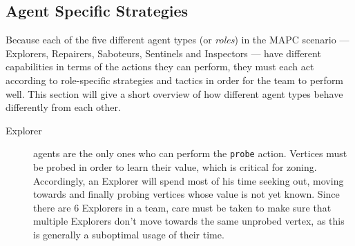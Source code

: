 \subsection{Agent Specific Strategies}\label{alg:agentstrategies}
Because each of the five different agent types (or \emph{roles}) in the MAPC scenario --- Explorers, Repairers, Saboteurs, Sentinels and Inspectors --- have different capabilities in terms of the actions they can perform, they must each act according to role-specific strategies and tactics in order for the team to perform well.
This section will give a short overview of how different agent types behave differently from each other.
\begin{description}
    \item[Explorer] agents are the only ones who can perform the \texttt{probe} action.
        Vertices must be probed in order to learn their value, which is critical for zoning.
        Accordingly, an Explorer will spend most of his time seeking out, moving towards and finally probing vertices whose value is not yet known.
        Since there are 6 Explorers in a team, care must be taken to make sure that multiple Explorers don't move towards the same unprobed vertex, as this is generally a suboptimal usage of their time.


\end{description}
